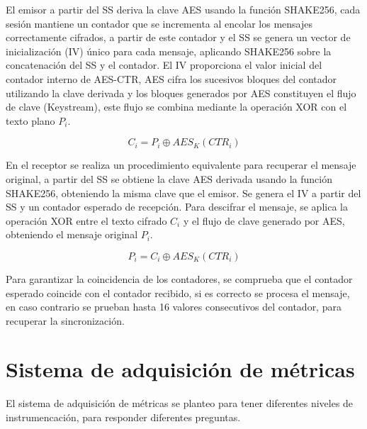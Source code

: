 El emisor a partir del SS deriva la clave AES usando la función SHAKE256, cada sesión mantiene un contador que se incrementa al encolar 
los mensajes correctamente cifrados, a partir de este contador y el SS se genera un vector de inicialización (IV) único para cada mensaje,
aplicando SHAKE256 sobre la concatenación del SS y el contador. El IV proporciona el valor inicial del contador interno de AES-CTR,
AES cifra los sucesivos bloques del contador utilizando la clave derivada y los bloques generados por AES constituyen el flujo de clave (Keystream), 
este flujo se combina mediante la operación XOR con el texto plano \(P_i\).

\begin{equation}
    C_i  = P_i \oplus AES_{K}(CTR_i) 
\end{equation}
 
En el receptor se realiza un procedimiento equivalente para recuperar el mensaje original, a partir del SS  se obtiene la clave AES derivada usando la 
función SHAKE256, obteniendo la misma clave que el emisor. Se genera el IV a partir del SS y un contador esperado de recepción. Para descifrar el mensaje, 
se aplica la operación XOR entre el texto cifrado \(C_i\) y el flujo de clave generado por AES, obteniendo el mensaje original \(P_i\).

\begin{equation}
    P_i  = C_i \oplus AES_{K}(CTR_i) 
\end{equation}

Para garantizar la coincidencia de los contadores, se comprueba que el contador esperado coincide con el contador
recibido, si es correcto se procesa el mensaje, en caso contrario se prueban hasta 16 valores consecutivos del contador, 
para recuperar la sincronización. 

\section{Sistema de adquisición de métricas}

El sistema de adquisición de métricas se planteo para tener diferentes niveles de instrumencación, para 
responder diferentes preguntas. 

